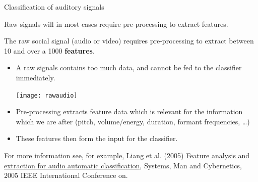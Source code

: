 \documentclass[compress]{beamer}
\begin{document}
\begin{frame}{Classification of auditory signals}

    Raw signals will in most cases require pre-processing to extract
features.

The raw social signal (audio or video) requires pre-processing to
extract between 10 and over a 1000 \textbf{features}.

\begin{itemize}

    \item A raw signals contains too much data, and cannot be fed to the
      classifier immediately.

        \begin{center}
            \texttt{[image: rawaudio]}
        \end{center}

    \item Pre-processing extracts feature data which is relevant for the
  information which we are after (pitch, volume/energy, duration,
  formant frequencies, \ldots{})
    \item These features then form the input for the classifier.
\end{itemize}

    {\footnotesize
For more information see, for example, Liang et al. (2005)
\href{http://ieeexplore.ieee.org/xpls/icp.jsp?arnumber=1571239}{Feature
analysis and extraction for audio automatic classification}, Systems,
Man and Cybernetics, 2005 IEEE International Conference on.
    }


\end{frame}
\end{document}
